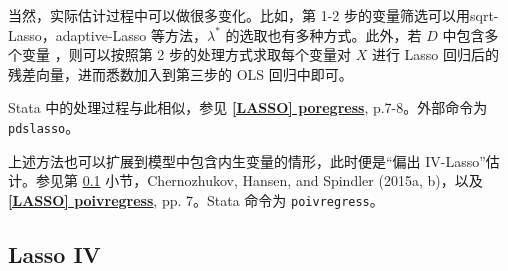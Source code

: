 { \def\FigName{Fig-lasso-poreg-01}
%	
%		
%		




当然，实际估计过程中可以做很多变化。比如，第 1-2 步的变量筛选可以用sqrt-Lasso，adaptive-Lasso 等方法，$\lambda^*$ 的选取也有多种方式。此外，若 $D$ 中包含多个变量%
，则可以按照第 2 步的处理方式求取每个变量对 $X$ 进行 Lasso 回归后的残差向量，进而悉数加入到第三步的 OLS 回归中即可。

Stata 中的处理过程与此相似，参见 \href{https://www.stata.com/manuals/lassoporegress.pdf}{\bfseries{[\MakeUppercase{lasso}] poregress}}, p.7-8。外部命令为 \texttt{pdslasso}。

上述方法也可以扩展到模型中包含内生变量的情形，此时便是“偏出 IV-Lasso”估计。参见第 \ref{sec:lasso-IV} 小节，Chernozhukov, Hansen, and Spindler (2015a, b)，以及 \href{https://www.stata.com/manuals/lassopoivregress.pdf}{\bfseries{[\MakeUppercase{lasso}] poivregress}}, pp. 7。Stata 命令为 \texttt{poivregress}。 









\subsection{Lasso IV}\label{sec:lasso-IV}

}
